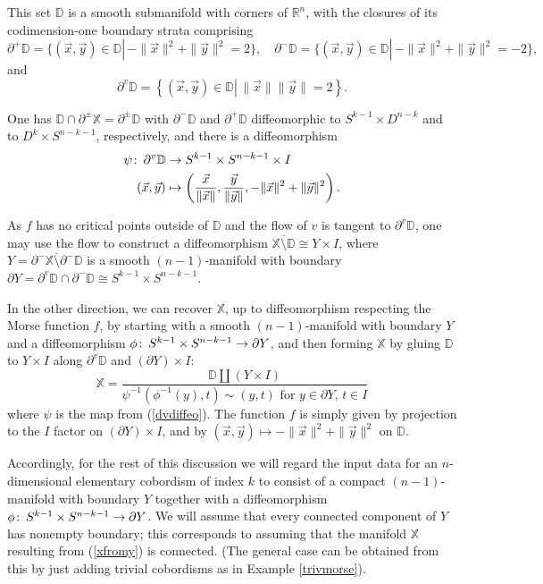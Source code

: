 \documentclass[11pt]{amsart}
\theoremstyle{definition}
\theoremstyle{remark}
\numberwithin{equation}{section}
\def\co{\colon\thinspace}
\begin{document}
This set $\mathbb{D}$ is a smooth submanifold with corners of $\mathbb{R}^n$, with the closures of its codimension-one boundary strata comprising \[ \partial^+\mathbb{D}=\{(\vec{x},\vec{y})\in\mathbb{D}|\,-\|\vec{x}\|^2+\|\vec{y}\|^2=2\},\quad  \partial^-\mathbb{D}=\{(\vec{x},\vec{y})\in\mathbb{D}|\,-\|\vec{x}\|^2+\|\vec{y}\|^2=-2\},\] and \[ \partial^v\mathbb{D}=\left\{\left.(\vec{x},\vec{y})\in\mathbb{D}\right|\,\|\vec{x}\|\|\vec{y}\|=2\right\}.\]

One has $\mathbb{D}\cap\partial^{\pm}\mathbb{X}=\partial^{\pm}\mathbb{D}$ with $\partial^-\mathbb{D}$ and $\partial^+\mathbb{D}$ diffeomorphic to $S^{k-1}\times D^{n-k}$ and to $D^{k}\times S^{n-k-1}$, respectively, and there is a diffeomorphism \begin{align}\nonumber \psi\co \partial^v\mathbb{D} &\to S^{k-1}\times S^{n-k-1}\times I \\ (\vec{x},\vec{y}) &\mapsto \left(\frac{\vec{x}}{\|\vec{x}\|},\frac{\vec{y}}{\|\vec{y}\|},-\|\vec{x}\|^2+\|\vec{y}\|^2   \right). \label{dvdiffeo}\end{align}


As $f$ has no critical points outside of $\mathbb{D}$ and the flow of $v$ is tangent to $\partial^v\mathbb{D}$, one may use the flow to construct a diffeomorphism $\overline{\mathbb{X}\setminus \mathbb{D}}\cong Y\times I$, where $Y=\overline{\partial^-\mathbb{X}\setminus\partial^-\mathbb{D}}$ is a smooth $(n-1)$-manifold with boundary $\partial Y=\partial^v\mathbb{D}\cap \partial^-\mathbb{D}\cong S^{k-1}\times S^{n-k-1}$.  

In the other direction, we can recover $\mathbb{X}$, up to diffeomorphism respecting the Morse function $f$, by starting with a smooth $(n-1)$-manifold with boundary $Y$ and a diffeomorphism $\phi\co S^{k-1}\times S^{n-k-1}\to \partial Y$, and then forming $\mathbb{X}$ by gluing $\mathbb{D}$ to $Y\times I$ along $\partial^v\mathbb{D}$ and $(\partial Y)\times I$: \begin{equation}\label{xfromy} \mathbb{X}=\frac{\mathbb{D}\coprod (Y\times I)}{\psi^{-1}(\phi^{-1}(y),t)\sim (y,t)\mbox{ for }y\in\partial Y,\,t\in I} \end{equation}   	where $\psi$ is the map from (\ref{dvdiffeo}).  The function $f$ is simply given by projection to the $I$ factor on $(\partial Y)\times I$, and by $(\vec{x},\vec{y})\mapsto -\|\vec{x}\|^2+\|\vec{y}\|^2$ on $\mathbb{D}$.

Accordingly, for the rest of this discussion we will regard the input data for an $n$-dimensional elementary cobordism of index $k$ to consist of a compact $(n-1)$-manifold with boundary $Y$ together with a diffeomorphism $\phi\co S^{k-1}\times S^{n-k-1}\to \partial Y$.  We will assume that every connected component of $Y$ has nonempty boundary; this corresponds to assuming that the manifold $\mathbb{X}$ resulting from (\ref{xfromy}) is connected. (The general case can be obtained from this by just adding trivial cobordisms as in Example \ref{trivmorse}).
\end{document}

